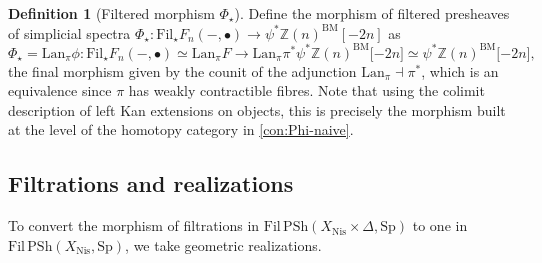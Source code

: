 \documentclass[11pt, twoside]{article}
\numberwithin{equation}{section}
\newtheorem{lemma}[equation]{Lemma}
\theoremstyle{definition}
\newtheorem{definition}[equation]{Definition}
\newcommand{\bb}[1]{\mathbb{#1}}
\newcommand{\colim}{\varinjlim}
\newcommand{\fil}{\mathrm{Fil}}
\newcommand{\Sp}{\mathrm{Sp}}
\newcommand{\bm}{\mathrm{BM}}
\newcommand{\psh}{\mathrm{PSh}}
\newcommand{\lan}{\mathrm{Lan}}
\newcommand{\fun}{\mathrm{Fun}}
\newcommand{\nis}{\mathrm{Nis}}
\begin{document}
\begin{definition}[Filtered morphism \(\Phi_\star\)]
Define the morphism of filtered presheaves of simplicial spectra \(\Phi_\star \colon \fil_\star F_n( -, \bullet) \to \psi^* \bb{Z}(n)^\bm [-2n]\) as 
\[\Phi_\star = \lan_\pi \phi \colon \fil_\star F_n( -, \bullet) \simeq  \lan_\pi F \to \lan_\pi \pi^* \psi^* \bb{Z}(n)^\bm \lbrack -2n \rbrack \simeq \psi^* \bb{Z}(n)^\bm \lbrack -2n \rbrack,\]
the final morphism given by the counit of the adjunction \(\lan_\pi \dashv \pi^*\), which is an equivalence since \(\pi\) has weakly contractible fibres. Note that using the colimit description of left Kan extensions on objects, this is precisely the morphism built at the level of the homotopy category in \ref{con:Phi-naive}.
\end{definition}



\subsection{Filtrations and realizations}
To convert the morphism of filtrations in \(\fil \, \psh(X_\nis \times \Delta, \Sp)\) to one in \(\fil \, \psh(X_\nis, \Sp)\), we take geometric realizations.
\end{document}
